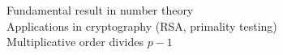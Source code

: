 \documentclass[preview]{standalone}
\begin{document}
Fundamental result in number theory\\Applications in cryptography (RSA, primality testing)\\Multiplicative order divides $p-1$\\
\end{document}
